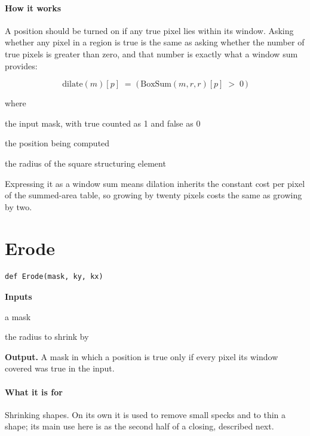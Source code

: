 \paragraph{How it works}
A position should be turned on if any true pixel lies within its window. Asking whether any pixel in a region is true is the same as asking whether the number of true pixels is greater than zero, and that number is exactly what a window sum provides:


\begin{equation}
\mathrm{dilate}(m)[p] \;=\; \big(\,\mathrm{BoxSum}(m,r,r)[p] \;>\; 0 \,\big)
\end{equation}

\noindent where
\begin{description}[leftmargin=2.4em,style=nextline,font=\normalfont\ttfamily]\setlength\itemsep{1pt}
  \item[{$m$}] \normalfont the input mask, with true counted as 1 and false as 0
  \item[{$p$}] \normalfont the position being computed
  \item[{$r$}] \normalfont the radius of the square structuring element
\end{description}
Expressing it as a window sum means dilation inherits the constant cost per pixel of the summed-area table, so growing by twenty pixels costs the same as growing by two.


\section{Erode}
\begin{lstlisting}[style=sig]
def Erode(mask, ky, kx)
\end{lstlisting}

\noindent\textbf{Inputs}
\begin{description}[leftmargin=2.2em,style=nextline,font=\normalfont\ttfamily]\setlength\itemsep{1pt}
  \item[{m}] \normalfont a mask
  \item[{r}] \normalfont the radius to shrink by
\end{description}

\noindent\textbf{Output.} A mask in which a position is true only if every pixel its window covered was true in the input.


\paragraph{What it is for}
Shrinking shapes. On its own it is used to remove small specks and to thin a shape; its main use here is as the second half of a closing, described next.


